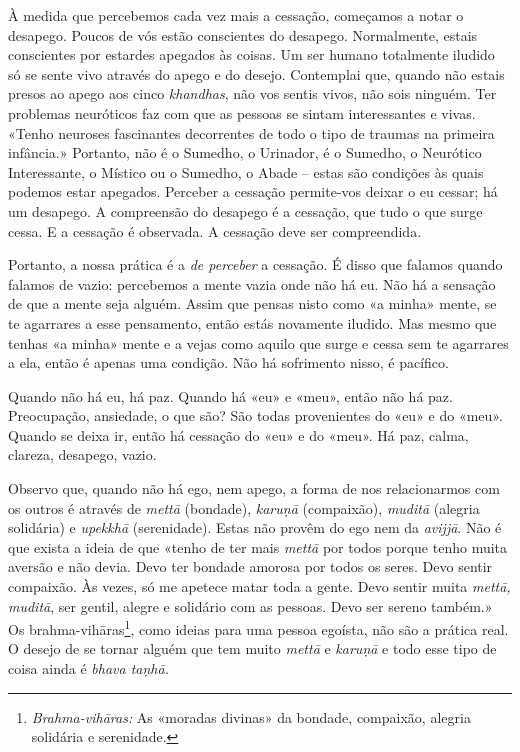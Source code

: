 À medida que percebemos cada vez mais a cessação, começamos a notar o desapego.
Poucos de vós estão conscientes do desapego. Normalmente, estais conscientes por
estardes apegados às coisas. Um ser humano totalmente iludido só se sente vivo
através do apego e do desejo. Contemplai que, quando não estais presos ao apego
aos cinco \emph{khandhas}, não vos sentis vivos, não sois ninguém. Ter problemas
neuróticos faz com que as pessoas se sintam interessantes e vivas. «Tenho
neuroses fascinantes decorrentes de todo o tipo de traumas na primeira
infância.» Portanto, não é o Sumedho, o Urinador, é o Sumedho, o Neurótico
Interessante, o Místico ou o Sumedho, o Abade -- estas são condições às quais
podemos estar apegados. Perceber a cessação permite-vos deixar o eu cessar; há
um desapego. A compreensão do desapego é a cessação, que tudo o que surge cessa.
E a cessação é observada. A cessação deve ser compreendida.

Portanto, a nossa prática é a \emph{de perceber} a cessação. É disso que falamos
quando falamos de vazio: percebemos a mente vazia onde não há eu. Não há a
sensação de que a mente seja alguém. Assim que pensas nisto como «a minha»
mente, se te agarrares a esse pensamento, então estás novamente iludido. Mas
mesmo que tenhas «a minha» mente e a vejas como aquilo que surge e cessa sem te
agarrares a ela, então é apenas uma condição. Não há sofrimento nisso, é
pacífico.

Quando não há eu, há paz. Quando há «eu» e «meu», então não há paz. Preocupação,
ansiedade, o que são? São todas provenientes do «eu» e do «meu». Quando se deixa
ir, então há cessação do «eu» e do «meu». Há paz, calma, clareza, desapego,
vazio.

Observo que, quando não há ego, nem apego, a forma de nos relacionarmos com os
outros é através de \emph{mettā} (bondade), \emph{karuṇā} (compaixão),
\emph{muditā} (alegria solidária) e \emph{upekkhā} (serenidade). Estas não
provêm do ego nem da \emph{avijjā}. Não é que exista a ideia de que «tenho de
ter mais \emph{mettā} por todos porque tenho muita aversão e não devia. Devo ter
bondade amorosa por todos os seres. Devo sentir compaixão. Às vezes, só me
apetece matar toda a gente. Devo sentir muita \emph{mettā, muditā}, ser gentil,
alegre e solidário com as pessoas. Devo ser sereno também.» Os
brahma-vihāras\footnote{\emph{Brahma-vihāras:} As «moradas divinas» da
  bondade, compaixão, alegria solidária e serenidade.}, como ideias para uma
pessoa egoísta, não são a prática real. O desejo de se tornar alguém que tem
muito \emph{mettā} e \emph{karuṇā} e todo esse tipo de coisa ainda é \emph{bhava
  taṇhā.}


